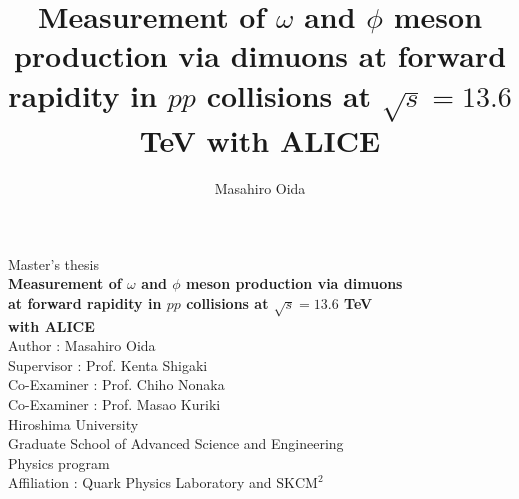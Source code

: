 \documentclass[11pt,a4paper,titlepage]{article}
\title{Measurement of $\omega$ and $\phi$ meson production via dimuons at forward rapidity in $pp$ collisions at $\sqrt{s}=13.6$ TeV with ALICE}
\author{Masahiro Oida}
\date{}
\begin{document}
  \setlength{\headheight}{18.0pt}
  \addtolength{\topmargin}{-4.0pt}
  \setlength{\baselineskip}{1.2\baselineskip}
  \begin{titlepage}
    \centering  %
    \vspace*{30mm} %

    {\Large Master's thesis} \\[20mm] %
    
    {\LARGE \textbf{Measurement of $\omega$ and $\phi$ meson production via dimuons\\ at forward rapidity in $pp$ collisions at $\sqrt{s}=13.6$ TeV \\ with ALICE}} \\[50mm] %
  


    {\Large Author : Masahiro Oida} \\[10mm]
    {\Large Supervisor  : Prof. Kenta Shigaki} \\[5mm] %
    {\Large Co-Examiner : Prof. Chiho Nonaka} \\[5mm] %
    {\Large Co-Examiner : Prof. Masao Kuriki} \\[5mm] %

    {\large Hiroshima University \\
    Graduate School of Advanced Science and Engineering \\
    Physics program}\\[10mm]
    {\large Affiliation : Quark Physics Laboratory and $\mathrm{SKCM^2}$} \\[5mm]

  \end{titlepage}

    \setcounter{tocdepth}{3}
    \tableofcontents
    \newpage
    \setcounter{section}{0}
    
    
    
    
    
    
    \newpage
    \begin{thebibliography}{99}
      
    \end{thebibliography}
\end{document}

